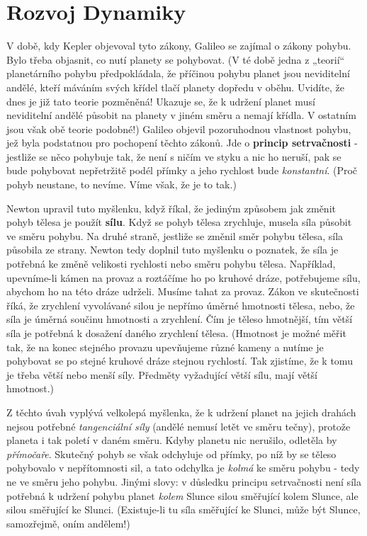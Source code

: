 {  \section{Rozvoj Dynamiky}
    V době, kdy Kepler objevoval tyto zákony, Galileo se zajímal o zákony pohybu. Bylo třeba 
    objasnit, co nutí planety se pohybovat. (V té době jedna z „teorií“ planetárního pohybu 
    předpokládala, že příčinou pohybu planet jsou neviditelní andělé, kteří máváním svých křídel 
    tlačí planety dopředu v oběhu. Uvidíte, že dnes je již tato teorie pozměněná! Ukazuje se, že k 
    udržení planet musí neviditelní andělé působit na planety v jiném směru a nemají křídla. V 
    ostatním jsou však obě teorie podobné!) Galileo objevil pozoruhodnou vlastnost pohybu, jež byla 
    podstatnou pro pochopení těchto zákonů. Jde o \textbf{princip setrvačnosti} - jestliže se něco 
    pohybuje tak, že není s ničím ve styku a nic ho neruší, pak se bude pohybovat nepřetržitě podél 
    přímky a jeho rychlost bude \emph{konstantní}. (Proč pohyb neustane, to nevíme. Víme však, že 
    je to tak.)
    
    Newton upravil tuto myšlenku, když říkal, že jediným způsobem jak změnit pohyb tělesa je použít 
    \textbf{sílu}. Když se pohyb tělesa zrychluje, musela síla působit ve směru pohybu. Na druhé 
    straně, jestliže se změnil směr pohybu tělesa, síla působila ze strany. Newton tedy doplnil 
    tuto myšlenku o poznatek, že síla je potřebná ke změně velikosti rychlosti nebo směru pohybu 
    tělesa. Například, upevníme-li kámen na provaz a roztáčíme ho po kruhové dráze, potřebujeme 
    sílu, abychom ho na této dráze udrželi. Musíme tahat za provaz. Zákon ve skutečnosti říká, že 
    zrychlení vyvolávané silou je nepřímo úměrné hmotnosti tělesa, nebo, že síla je úměrná součinu 
    hmotnosti a zrychlení. Čím je těleso hmotnější, tím větší síla je potřebná k dosažení daného 
    zrychlení tělesa. (Hmotnost je možné měřit tak, že na konec stejného provazu upevňujeme různé 
    kameny a nutíme je pohybovat se po stejné kruhové dráze stejnou rychlostí. Tak zjistíme, že k 
    tomu je třeba větší nebo menší síly. Předměty vyžadující větší sílu, mají větší hmotnost.)
    
    Z těchto úvah vyplývá velkolepá myšlenka, že k udržení planet na jejich drahách nejsou potřebné 
    \emph{tangenciální síly} (andělé nemusí letět ve směru tečny), protože planeta i tak poletí v 
    daném směru. Kdyby planetu nic nerušilo, odletěla by \emph{přímočaře}. Skutečný pohyb se však 
    odchyluje od přímky, po níž by se těleso pohybovalo v nepřítomnosti sil, a tato odchylka je 
    \emph{kolmá} ke směru pohybu - tedy ne ve směru jeho pohybu. Jinými slovy: v důsledku principu 
    setrvačnosti není síla potřebná k udržení pohybu planet \emph{kolem} Slunce silou směřující 
    kolem Slunce, ale silou směřující ke Slunci. (Existuje-li tu síla směřující ke Slunci, může být 
    Slunce, samozřejmě, oním andělem!)
    
}
